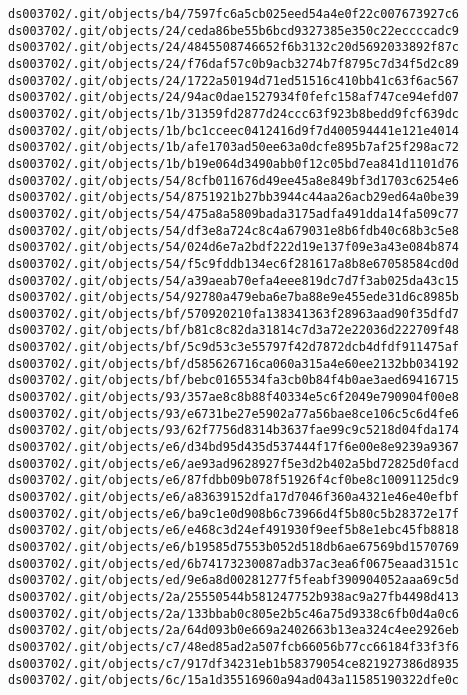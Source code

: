 \documentclass[11pt]{article}
\begin{document}
\begin{Verbatim}[commandchars=\\\{\}]
ds003702/.git/objects/b4/7597fc6a5cb025eed54a4e0f22c007673927c6
ds003702/.git/objects/24/ceda86be55b6bcd9327385e350c22eccccadc9
ds003702/.git/objects/24/4845508746652f6b3132c20d5692033892f87c
ds003702/.git/objects/24/f76daf57c0b9acb3274b7f8795c7d34f5d2c89
ds003702/.git/objects/24/1722a50194d71ed51516c410bb41c63f6ac567
ds003702/.git/objects/24/94ac0dae1527934f0fefc158af747ce94efd07
ds003702/.git/objects/1b/31359fd2877d24ccc63f923b8bedd9fcf639dc
ds003702/.git/objects/1b/bc1cceec0412416d9f7d400594441e121e4014
ds003702/.git/objects/1b/afe1703ad50ee63a0dcfe895b7af25f298ac72
ds003702/.git/objects/1b/b19e064d3490abb0f12c05bd7ea841d1101d76
ds003702/.git/objects/54/8cfb011676d49ee45a8e849bf3d1703c6254e6
ds003702/.git/objects/54/8751921b27bb3944c44aa26acb29ed64a0be39
ds003702/.git/objects/54/475a8a5809bada3175adfa491dda14fa509c77
ds003702/.git/objects/54/df3e8a724c8c4a679031e8b6fdb40c68b3c5e8
ds003702/.git/objects/54/024d6e7a2bdf222d19e137f09e3a43e084b874
ds003702/.git/objects/54/f5c9fddb134ec6f281617a8b8e67058584cd0d
ds003702/.git/objects/54/a39aeab70efa4eee819dc7d7f3ab025da43c15
ds003702/.git/objects/54/92780a479eba6e7ba88e9e455ede31d6c8985b
ds003702/.git/objects/bf/570920210fa138341363f28963aad90f35dfd7
ds003702/.git/objects/bf/b81c8c82da31814c7d3a72e22036d222709f48
ds003702/.git/objects/bf/5c9d53c3e55797f42d7872dcb4dfdf911475af
ds003702/.git/objects/bf/d585626716ca060a315a4e60ee2132bb034192
ds003702/.git/objects/bf/bebc0165534fa3cb0b84f4b0ae3aed69416715
ds003702/.git/objects/93/357ae8c8b88f40334e5c6f2049e790904f00e8
ds003702/.git/objects/93/e6731be27e5902a77a56bae8ce106c5c6d4fe6
ds003702/.git/objects/93/62f7756d8314b3637fae99c9c5218d04fda174
ds003702/.git/objects/e6/d34bd95d435d537444f17f6e00e8e9239a9367
ds003702/.git/objects/e6/ae93ad9628927f5e3d2b402a5bd72825d0facd
ds003702/.git/objects/e6/87fdbb09b078f51926f4cf0be8c10091125dc9
ds003702/.git/objects/e6/a83639152dfa17d7046f360a4321e46e40efbf
ds003702/.git/objects/e6/ba9c1e0d908b6c73966d4f5b80c5b28372e17f
ds003702/.git/objects/e6/e468c3d24ef491930f9eef5b8e1ebc45fb8818
ds003702/.git/objects/e6/b19585d7553b052d518db6ae67569bd1570769
ds003702/.git/objects/ed/6b74173230087adb37ac3ea6f0675eaad3151c
ds003702/.git/objects/ed/9e6a8d00281277f5feabf390904052aaa69c5d
ds003702/.git/objects/2a/25550544b581247752b938ac9a27fb4498d413
ds003702/.git/objects/2a/133bbab0c805e2b5c46a75d9338c6fb0d4a0c6
ds003702/.git/objects/2a/64d093b0e669a2402663b13ea324c4ee2926eb
ds003702/.git/objects/c7/48ed85ad2a507fcb66056b77cc66184f33f3f6
ds003702/.git/objects/c7/917df34231eb1b58379054ce821927386d8935
ds003702/.git/objects/6c/15a1d35516960a94ad043a11585190322dfe0c

\end{Verbatim}
\end{document}
